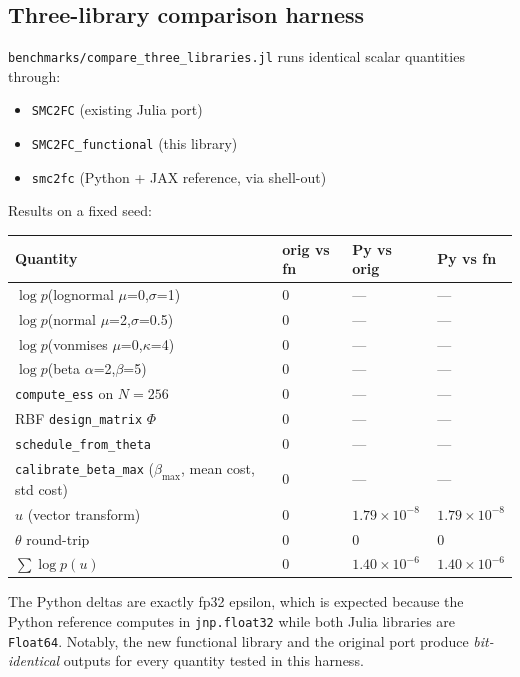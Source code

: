 \documentclass[11pt,a4paper]{article}
\begin{document}
\subsection{Three-library comparison harness}
\texttt{benchmarks/compare\_three\_libraries.jl} runs identical scalar
quantities through:
\begin{itemize}[leftmargin=*]
\item \texttt{SMC2FC} (existing Julia port)
\item \texttt{SMC2FC\_functional} (this library)
\item \texttt{smc2fc} (Python + JAX reference, via shell-out)
\end{itemize}

Results on a fixed seed:

\begin{longtable}{p{}p{}p{}p{}}
\toprule
\textbf{Quantity} & \textbf{orig vs fn} & \textbf{Py vs orig} &
\textbf{Py vs fn} \\
\midrule
$\log p$(lognormal $\mu$=0,$\sigma$=1) & $0$ & --- & --- \\
$\log p$(normal $\mu$=2,$\sigma$=0.5) & $0$ & --- & --- \\
$\log p$(vonmises $\mu$=0,$\kappa$=4) & $0$ & --- & --- \\
$\log p$(beta $\alpha$=2,$\beta$=5)   & $0$ & --- & --- \\
\addlinespace
\texttt{compute\_ess} on $N{=}256$    & $0$ & --- & --- \\
\addlinespace
RBF \texttt{design\_matrix} $\Phi$    & $0$ & --- & --- \\
\texttt{schedule\_from\_theta}        & $0$ & --- & --- \\
\addlinespace
\texttt{calibrate\_beta\_max} ($\beta_\mathrm{max}$, mean cost,
std cost) & $0$ & --- & --- \\
\addlinespace
$u$ (vector transform) & $0$ & $1.79 \times 10^{-8}$ &
$1.79 \times 10^{-8}$ \\
$\theta$ round-trip    & $0$ & $0$ & $0$ \\
$\sum \log p(u)$       & $0$ & $1.40 \times 10^{-6}$ &
$1.40 \times 10^{-6}$ \\
\bottomrule
\end{longtable}

The Python deltas are exactly fp32 epsilon, which is expected because the
Python reference computes in \texttt{jnp.float32} while both Julia
libraries are \texttt{Float64}. Notably, the new functional library and
the original port produce \emph{bit-identical} outputs for every quantity
tested in this harness.
\end{document}

